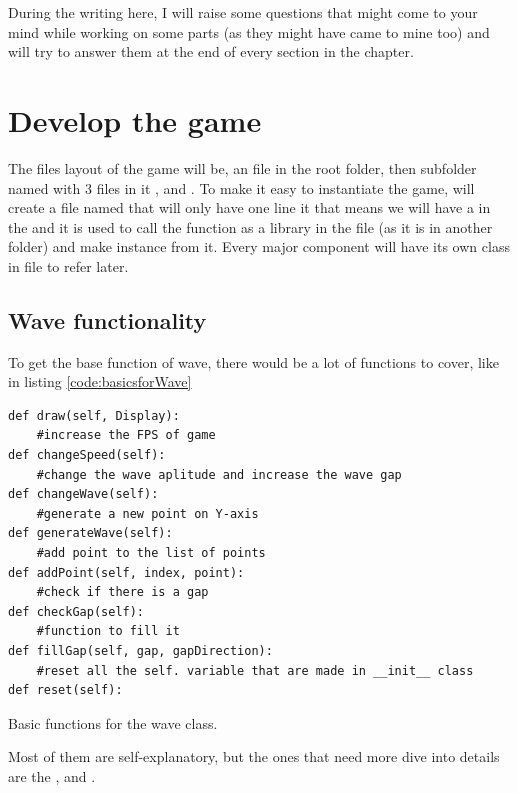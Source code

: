 During the writing here, I will raise some questions that might come to your mind while working on some parts (as they might have came to mine too) and will try to answer them at the end of every section in the chapter.

\section{Develop the game}\label{develop-the-game}

The files layout of the game will be, an  file in the root folder, then subfolder named  with 3 files in it ,  and . To make it easy to instantiate the game, will create a file named  that will only have one line it  that means we will have a  in the  and it is used to call the  function as a library in the  file (as it is in another folder) and make instance from it. Every major component will have its own class in file to refer later. 

\subsection{Wave functionality}\label{wave-functionality}
To get the base function of wave, there would be a lot of functions to cover, like in listing \ref{code:basicsforWave}

\begin{listing}[!ht]
\begin{verbatim}
def draw(self, Display):
	#increase the FPS of game
def changeSpeed(self):
	#change the wave aplitude and increase the wave gap
def changeWave(self):
	#generate a new point on Y-axis
def generateWave(self):
	#add point to the list of points
def addPoint(self, index, point):
	#check if there is a gap 
def checkGap(self):
	#function to fill it
def fillGap(self, gap, gapDirection):
	#reset all the self. variable that are made in __init__ class 
def reset(self):
\end{verbatim}
\caption{Basic functions for the wave class.}
\label{code:basicsforWave}
\end{listing}

Most of them are self-explanatory, but the ones that need more dive into details are the ,  and .


